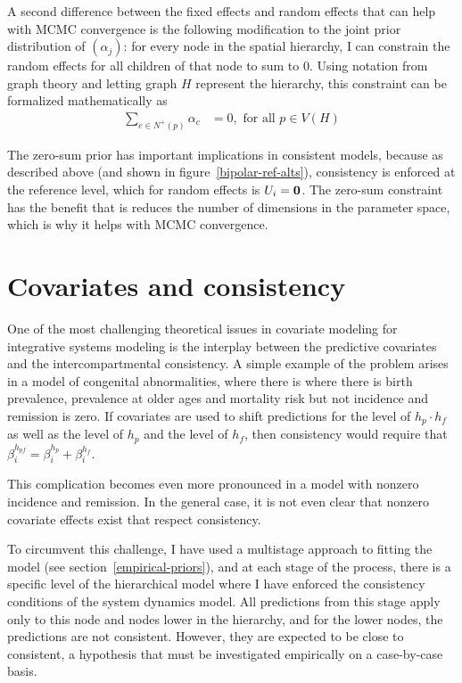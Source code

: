 A second difference between the fixed effects and random effects that
can help with MCMC convergence is
the following modification to the joint prior distribution of $\left(\alpha_j\right)$: for every node in the spatial hierarchy, I can
constrain the random
effects for all children of that node to sum to $0$.  Using notation from graph theory and letting graph $H$ represent the
hierarchy, this constraint can be formalized mathematically as
\begin{align*}
\sum_{c\in N^+(p)} \alpha_c &= 0, \text{ for all } p \in V(H)
\end{align*}

The zero-sum prior has important implications in consistent
models, because as described above (and shown in
figure~\ref{bipolar-ref-alts}), consistency is enforced at the
reference level, which for random effects is $U_i = \mathbf{0}$.  The 
zero-sum constraint has the benefit that is reduces the number 
of dimensions in the parameter space, which is why it helps with MCMC convergence.

\section{Covariates and consistency}
One of the most challenging theoretical issues in covariate modeling
for integrative systems modeling is the interplay between the
predictive covariates and the intercompartmental consistency.  A
simple example of the problem arises in a model of congenital
abnormalities, where there is where there is birth prevalence,
prevalence at older ages and mortality risk but not incidence and
remission is zero. If covariates are used to shift predictions for the
level of $h_{p}\cdot h_{f}$ as well as the level of $h_{p}$ and the
level of $h_{f}$, then consistency would require that
$\beta^{h_{pf}}_i = \beta^{h_p}_i + \beta^{h_f}_i$.

This complication becomes even more pronounced in a model with
nonzero incidence and remission.  In the general case, it is not
even clear that nonzero covariate effects exist that respect
consistency.

To circumvent this challenge, I have used a multistage approach to
fitting the model (see section~\ref{empirical-priors}), and at each
stage of the process, there is a specific level of the hierarchical
model where I have enforced the consistency conditions of the system
dynamics model.  All predictions from this stage apply only to this
node and nodes lower in the hierarchy, and for the lower nodes, the
predictions are not consistent.  However, they are expected to
be close to consistent, a hypothesis that must be investigated
empirically on a case-by-case basis.


